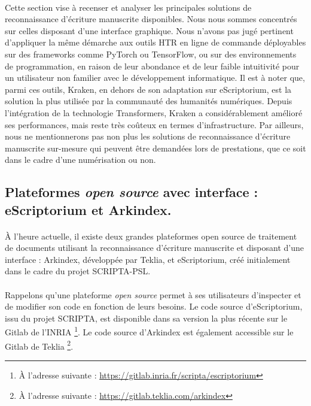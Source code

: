 \documentclass[a4paper,12pt,twoside]{book}
\begin{document}
	\paragraph{}
	Cette section vise à recenser et analyser les principales solutions de reconnaissance d’écriture manuscrite disponibles. Nous nous sommes concentrés sur celles disposant d’une interface graphique. Nous n'avons pas jugé pertinent d’appliquer la même démarche aux outils HTR en ligne de commande déployables sur des frameworks comme PyTorch ou TensorFlow, ou sur des environnements de programmation, en raison de leur abondance et de leur faible intuitivité pour un utilisateur non familier avec le développement informatique. Il est à noter que, parmi ces outils, Kraken, en dehors de son adaptation sur eScriptorium, est la solution la plus utilisée par la communauté des humanités numériques. Depuis l’intégration de la technologie Transformers, Kraken a considérablement amélioré ses performances, mais reste très coûteux en termes d’infrastructure. Par ailleurs, nous ne mentionnerons pas non plus les solutions de reconnaissance d’écriture manuscrite sur-mesure qui peuvent être demandées lors de prestations, que ce soit dans le cadre d’une numérisation ou non. 

		\subsection{Plateformes \textit{open source} avec interface : eScriptorium et Arkindex.}
	
\paragraph{}
À l’heure actuelle, il existe deux grandes plateformes open source de traitement de documents utilisant la reconnaissance d’écriture manuscrite et disposant d’une interface : Arkindex, développée par Teklia, et eScriptorium, créé initialement dans le cadre du projet SCRIPTA-PSL.

\paragraph{}
Rappelons qu’une plateforme \textit{open source} permet à ses utilisateurs d’inspecter et de modifier son code en fonction de leurs besoins. Le code source d’eScriptorium, issu du projet SCRIPTA, est disponible dans sa version la plus récente sur le Gitlab de l’INRIA \footnote{À l’adresse suivante : \url{https://gitlab.inria.fr/scripta/escriptorium}}. Le code source d’Arkindex est également accessible sur le Gitlab de Teklia \footnote{À l’adresse suivante : \url{https://gitlab.teklia.com/arkindex}}.
\end{document}
